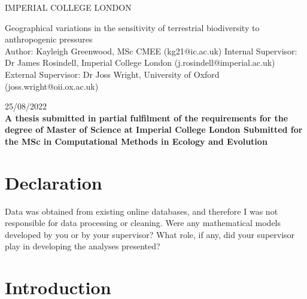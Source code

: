 \documentclass[11pt, a4paper, titlepage]{article}
\begin{document}
    \begin{titlepage}
    \begin{center}
            {\large IMPERIAL COLLEGE LONDON}
    \end{center}
    
    \vspace*{\fill}
    
    \begin{center}
        {\Huge 
    	 Geographical variations in the sensitivity of terrestrial biodiversity to anthropogenic pressures}
        \\[2in]
        Author: Kayleigh Greenwood, MSc CMEE (kg21@ic.ac.uk)
        \bigskip
        \newline
       Internal Supervisor: Dr James Rosindell, Imperial College London (j.rosindell@imperial.ac.uk)
       \bigskip
       \newline
        External Supervisor: Dr Joss Wright, University of Oxford (joss.wright@oii.ox.ac.uk)
        \bigskip
        \newline

        25/08/2022
        \\[2in]
        
        {\bfseries A thesis submitted in partial fulfilment of the requirements for the degree of Master of Science at Imperial College London \newline \newline Submitted for the MSc in Computational Methods in Ecology and Evolution }

        

    
	\end{center}
    \vspace{\fill}
    
    \end{titlepage}
	\section*{Declaration}
	\begin{center}
	Data was obtained from existing online databases, and therefore I was not responsible for data processing or cleaning. \newline
	Were any mathematical models developed by you or by your supervisor? \newline
	What role, if any, did your supervisor play in developing the analyses presented?
	\end{center}

	\newpage
    \section*{Introduction}
    
\end{document}
